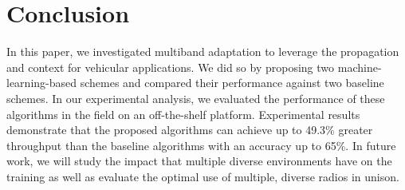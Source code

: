 \section{Conclusion}
\label{sec:conclusion}
In this paper, we investigated multiband adaptation to leverage the propagation and context for vehicular applications. 
We did so by proposing two machine-learning-based schemes and compared their
performance against two baseline schemes.
In our experimental analysis, we evaluated the performance of these algorithms 
in the field on an off-the-shelf platform.
Experimental results demonstrate that the proposed algorithms can 
achieve up to 49.3\% greater throughput than the baseline algorithms
with an accuracy up to 65\%. In future work, we will study the impact that
multiple diverse environments have on the training as well as evaluate
the optimal use of multiple, diverse radios in unison.
